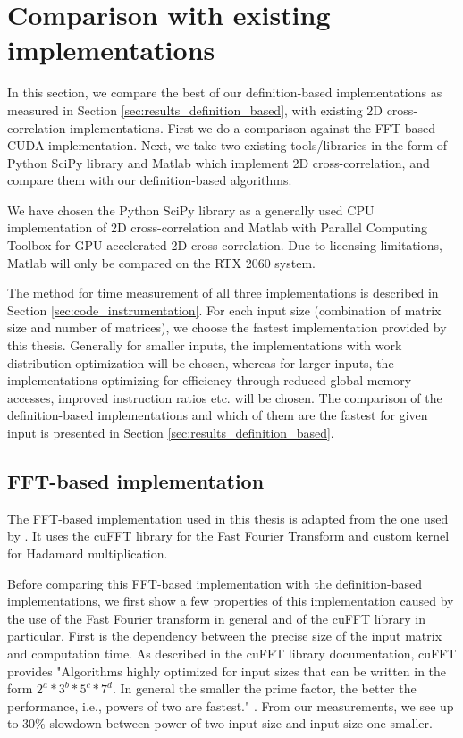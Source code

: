 \section{Comparison with existing implementations}

In this section, we compare the best of our definition-based implementations as measured in Section \ref{sec:results_definition_based}, with existing 2D cross-correlation implementations. First we do a comparison against the FFT-based CUDA implementation. Next, we take two existing tools/libraries in the form of Python SciPy \citet{journal:scipy} library and Matlab \citep{site:matlab} which implement 2D cross-correlation, and compare them with our definition-based algorithms.

We have chosen the Python SciPy  library as a generally used CPU implementation of 2D cross-correlation and Matlab with Parallel Computing Toolbox for GPU accelerated 2D cross-correlation. Due to licensing limitations, Matlab will only be compared on the RTX 2060 system.

The method for time measurement of all three implementations is described in Section \ref{sec:code_instrumentation}. For each input size (combination of matrix size and number of matrices), we choose the fastest implementation provided by this thesis. Generally for smaller inputs, the implementations with work distribution optimization will be chosen, whereas for larger inputs, the implementations optimizing for efficiency through reduced global memory accesses, improved instruction ratios etc. will be chosen. The comparison of the definition-based implementations and which of them are the fastest for given input is presented in Section \ref{sec:results_definition_based}. 

\subsection{FFT-based implementation}
\label{sec:results_fft_based}

The FFT-based implementation used in this thesis is adapted from the one used by \citet{misko}. It uses the cuFFT library for the Fast Fourier Transform and custom kernel for Hadamard multiplication. 

Before comparing this FFT-based implementation with the definition-based implementations, we first show a few properties of this implementation caused by the use of the Fast Fourier transform in general and of the cuFFT library in particular. First is the dependency between the precise size of the input matrix and computation time. As described in the cuFFT library documentation, cuFFT provides "Algorithms highly optimized for input sizes that can be written in the form $2^{a}*3^{b}*5^{c}*7^{d}$. In general the smaller the prime factor, the better the performance, i.e., powers of two are fastest." \citep{site:cufft}. From our measurements, we see up to 30\% 
slowdown between power of two input size and input size one smaller. 

